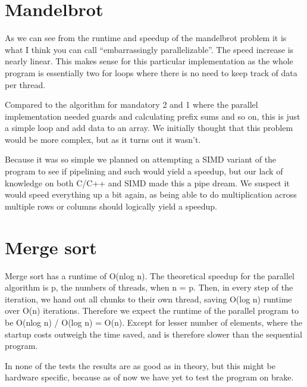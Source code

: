 \documentclass[12pt,a4paper,oneside,article]{memoir}
\numberwithin{equation}{chapter}
\begin{document}
\section{Mandelbrot} %
\label{sec:Mandelbrot}

As we can see from the runtime and speedup of the mandelbrot problem it is what 
I think you can call ``embarrassingly parallelizable''. The speed increase is nearly
linear. This makes sense for this particular implementation as the whole program is
essentially two for loops where there is no need to keep track of data per thread. 

Compared to the algorithm for mandatory 2 and 1 where the parallel implementation needed
guards and calculating prefix sums and so on, this is just a simple loop and add 
data to an array. We initially thought that this problem would be more complex, but 
as it turns out it wasn't. 

Because it was so simple we planned on attempting a SIMD variant of the program
to see if pipelining and such would yield a speedup, but our lack of knowledge 
on both C/C++ and SIMD made this a pipe dream. We suspect it would speed everything
up a bit again, as being able to do multiplication across multiple rows or columns
should logically yield a speedup.

\section{Merge sort}
Merge sort has a runtime of O(nlog n). The theoretical speedup for the parallel algorithm is p, the numbers of threads, when n = p. Then, in every step of the iteration, we hand out all chunks to their own thread, saving O(log n) runtime over O(n) iterations. Therefore we expect the runtime of the parallel program to be O(nlog n) / O(log n) = O(n). Except for lesser number of elements, where the startup costs outweigh the time saved, and is therefore slower than the sequential program.

In none of the tests the results are as good as in theory, but this might be hardware specific, because as of now we have yet to test the program on brake.
\end{document}

